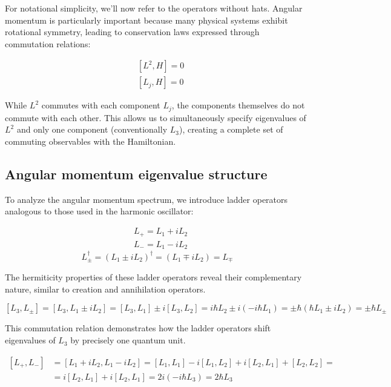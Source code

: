 \documentclass[italian]{HKNdocument}
\begin{document}
For notational simplicity, we'll now refer to the operators without hats. Angular momentum is particularly important because many physical systems exhibit rotational symmetry, leading to conservation laws expressed through commutation relations:

\begin{align}
& {\left[L^{2}, H\right]=0} \\
& {\left[L_{j}, H\right]=0} \label{eq:8.7}
\end{align}

While $L^2$ commutes with each component $L_j$, the components themselves do not commute with each other. This allows us to simultaneously specify eigenvalues of $L^2$ and only one component (conventionally $L_3$), creating a complete set of commuting observables with the Hamiltonian.

\subsection{Angular momentum eigenvalue structure}
To analyze the angular momentum spectrum, we introduce ladder operators analogous to those used in the harmonic oscillator:

\begin{align}
& L_{+}=L_{1}+i L_{2} \\
& L_{-}=L_{1}-i L_{2} \label{eq:8.8}
\end{align}
\begin{equation}
L_{ \pm}^{\dagger}=\left(L_{1} \pm i L_{2}\right)^{\dagger}=\left(L_{1} \mp i L_{2}\right)=L_{\mp} \label{eq:8.9}
\end{equation}

The hermiticity properties of these ladder operators reveal their complementary nature, similar to creation and annihilation operators.

\begin{equation}
\left[L_{3}, L_{ \pm}\right]=\left[L_{3}, L_{1} \pm i L_{2}\right]=\left[L_{3}, L_{1}\right] \pm i\left[L_{3}, L_{2}\right]=i \hbar L_{2} \pm i\left(-i \hbar L_{1}\right)= \pm \hbar\left(\hbar L_{1} \pm i L_{2}\right)= \pm \hbar L_{ \pm} \label{eq:8.10}
\end{equation}

This commutation relation demonstrates how the ladder operators shift eigenvalues of $L_3$ by precisely one quantum unit.

\begin{align}
{\left[L_{+}, L_{-}\right] } & =\left[L_{1}+i L_{2}, L_{1}-i L_{2}\right]=\left[L_{1}, L_{1}\right]-i\left[L_{1}, L_{2}\right]+i\left[L_{2}, L_{1}\right]+\left[L_{2}, L_{2}\right]= \\
& =i\left[L_{2}, L_{1}\right]+i\left[L_{2}, L_{1}\right]=2 i\left(-i \hbar L_{3}\right)=2 \hbar L_{3} \label{eq:8.11}
\end{align}
\end{document}
